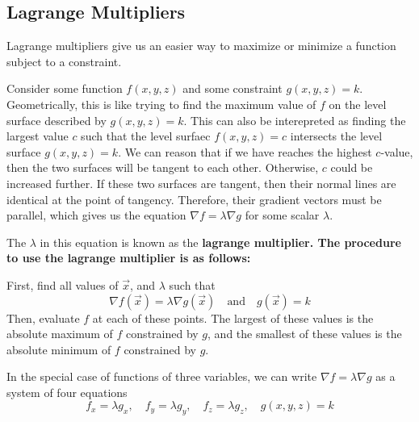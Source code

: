 \subsection{Lagrange Multipliers}
Lagrange multipliers give us an easier way to maximize or minimize a function subject to a constraint.\par
Consider some function \(f(x,y,z)\) and some constraint \(g(x,y,z)=k\). Geometrically, this is like trying to find the maximum value of \(f\) on the level surface described by \(g(x,y,z)=k\). This can also be interepreted as finding the largest value \(c\) such that the level surfaec \(f(x,y,z)=c\) intersects the level surface \(g(x,y,z)=k\). We can reason that if we have reaches the highest \(c\)-value, then the two surfaces will be tangent to each other. Otherwise, \(c\) could be increased further. If these two surfaces are tangent, then their normal lines are identical at the point of tangency. Therefore, their gradient vectors must be parallel, which gives us the equation \(\nabla f = \lambda \nabla g\) for some scalar \(\lambda\). \par
The \(\lambda\) in this equation is known as the \bf{lagrange multiplier}. The procedure to use the lagrange multiplier is as follows: \par
First, find all values of \(\vec x\), and \(\lambda\) such that
\[ \nabla f(\vec x) = \lambda\nabla g(\vec x) \quad\text{and}\quad g(\vec x)=k\]
Then, evaluate \(f\) at each of these points. The largest of these values is the absolute maximum of \(f\) constrained by \(g\), and the smallest of these values is the absolute minimum of \(f\) constrained by \(g\).
\par
In the special case of functions of three variables, we can write \(\nabla f = \lambda\nabla g\) as a system of four equations
\[ f_x = \lambda g_x,\quad f_y=\lambda g_y,\quad f_z=\lambda g_z,\quad g(x,y,z)=k\]
